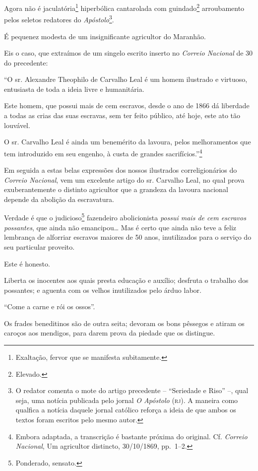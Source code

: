 Agora não é jaculatória\footnote{ Exaltação, fervor que se manifesta
  subitamente.} hiperbólica cantarolada com guindado\footnote{ Elevado.}
arroubamento pelos seletos redatores do \emph{Apóstolo}\footnote{ O
  redator comenta o mote do artigo precedente -- ``Seriedade e Riso'' --,
  qual seja, uma notícia publicada pelo jornal \emph{O Apóstolo} (\textsc{rj}). A
  maneira como qualfica a notícia daquele jornal católico reforça a
  ideia de que ambos os textos foram escritos pelo mesmo autor.}.

É pequenez modesta de um insignificante agricultor do Maranhão.

Eis o caso, que extraímos de um singelo escrito inserto no \emph{Correio
Nacional} de 30 do precedente:

``O sr. Alexandre Theophilo de Carvalho Leal é um homem ilustrado e
virtuoso, entusiasta de toda a ideia livre e humanitária.

Este homem, que possui mais de cem escravos, desde o ano de 1866 dá
liberdade a todas as crias das suas escravas, sem ter feito público, até
hoje, este ato tão louvável.

O sr. Carvalho Leal é ainda um benemérito da lavoura, pelos
melhoramentos que tem introduzido em seu engenho, à custa de grandes
sacrifícios.''\footnote{ Embora adaptada, a transcrição é bastante
  próxima do original. Cf. \emph{Correio Nacional}, Um agricultor
  distincto, 30/10/1869, pp.~1--2.}

Em seguida a estas belas expressões dos nossos ilustrados
correligionários do \emph{Correio Nacional}, vem um excelente artigo do
sr. Carvalho Leal, no qual prova exuberantemente o distinto agricultor
que a grandeza da lavoura nacional depende da abolição da escravatura.

Verdade é que o judicioso\footnote{ Ponderado, sensato.} fazendeiro
abolicionista \emph{possui mais de cem escravos possantes}, que ainda
não emancipou\ldots{} Mas é certo que ainda não teve a feliz lembrança de
alforriar escravos maiores de 50 anos, inutilizados para o serviço do
seu particular proveito.

Este é honesto.

Liberta os inocentes aos quais presta educação e auxílio; desfruta o
trabalho dos possantes; e aguenta com os velhos inutilizados pelo árduo
labor.

``Come a carne e rói os ossos''.

Os frades beneditinos são de outra seita; devoram os bons pêssegos e
atiram os caroços aos mendigos, para darem prova da piedade que os
distingue.

